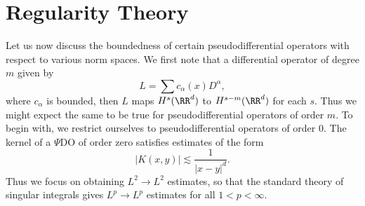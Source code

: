 


\section{Regularity Theory}

Let us now discuss the boundedness of certain pseudodifferential operators with respect to various norm spaces. We first note that a differential operator of degree $m$ given by
%
\[ L = \sum c_\alpha(x) D^\alpha, \]
%
where $c_\alpha$ is bounded, then $L$ maps $H^s(\RR^d)$ to $H^{s-m}(\RR^d)$ for each $s$. Thus we might expect the same to be true for pseudodifferential operators of order $m$. To begin with, we restrict ourselves to pseudodifferential operators of order $0$. The kernel of a $\Psi$DO of order zero satisfies estimates of the form
%
\[ |K(x,y)| \lesssim \frac{1}{|x - y|^d}. \]
%
Thus we focus on obtaining $L^2 \to L^2$ estimates, so that the standard theory of singular integrals gives $L^p \to L^p$ estimates for all $1 < p < \infty$.

